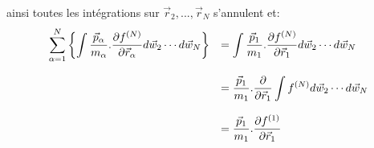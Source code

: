 ainsi toutes les intégrations sur $\vec{r}_{2},...,\vec{r}_{N}$ s'annulent et:
\begin{align*}%
	\begin{array}[c]{ll}%
		\displaystyle\sum\limits_{\alpha=1}^{N}\left\{  \displaystyle\int%
		\dfrac{\vec{p}_{\alpha}}{m_{\alpha}}.\dfrac{\partial f^{(N)}}%
		{\partial\vec{r}_{\alpha}}d\vec{w}_{2}\cdots d\vec{w}_{N}\right\}  &
		=\displaystyle\int\dfrac{\vec{p}_{1}}{m_{1}}.\dfrac{\partial f^{(N)}%
		}{\partial\vec{r}_{1}}d\vec{w}_{2}\cdots d\vec{w}_{N}\\
		& \\
		& =\dfrac{\vec{p}_{1}}{m_{1}}.\dfrac{\partial}{\partial\vec{r}_{1}%
		}\displaystyle\int f^{(N)}d\vec{w}_{2}\cdots d\vec{w}_{N}\\
		& \\
		& =\dfrac{\vec{p}_{1}}{m_{1}}.\dfrac{\partial f^{(1)}}{\partial
		\vec{r}_{1}}%
	\end{array}
\end{align*}

